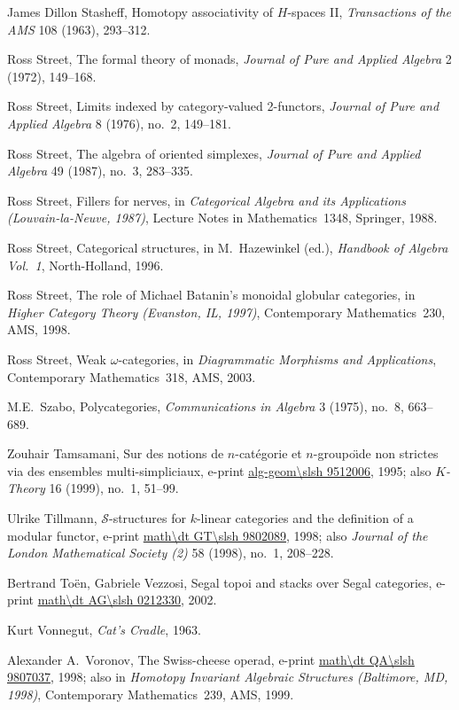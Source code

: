 \begin{thebibliography}{c9999}
James Dillon Stasheff,
Homotopy associativity of $H$-spaces II,
\emph{Transactions of the AMS} 108 (1963), 293--312.

Ross Street,
The formal theory of monads,
\emph{Journal of Pure and Applied Algebra} 2 (1972), 149--168.

Ross Street, 
Limits indexed by category-valued 2-functors,
\emph{Journal of Pure and Applied Algebra} 8 (1976), no.~2, 149--181.

Ross Street,
The algebra of oriented simplexes,
\emph{Journal of Pure and Applied Algebra} 49 (1987), no.~3, 283--335.

Ross Street,
Fillers for nerves,
in
\emph{Categorical Algebra and its Applications (Louvain-la-Neuve, 1987)},
Lecture Notes in Mathematics~1348,
Springer, 1988.

Ross Street,
Categorical structures, 
in
M.~Hazewinkel (ed.), 
\emph{Handbook of Algebra Vol.~1},
North-Holland, 1996.

Ross Street,
The role of Michael Batanin's monoidal globular categories,
in
\emph{Higher Category Theory (Evanston, IL, 1997)},
Contemporary Mathematics~230,
AMS, 1998.

Ross Street,
Weak $\omega$-categories,
in 
\emph{Diagrammatic Morphisms and Applications}, 
Contemporary Mathematics~318,
AMS, 2003.

M.E.~Szabo, 
Polycategories,
\emph{Communications in Algebra} 3 (1975), no.~8, 663--689.

Zouhair Tamsamani,
Sur des notions de $n$-cat\'egorie et $n$-groupo\"{\i}de non strictes via des
ensembles multi-simpliciaux,  
e-print \url{alg-geom\slsh 9512006}, 1995;
also
\emph{$K$-Theory} 16 (1999), no.~1, 51--99.

Ulrike Tillmann,
$\mathcal{S}$-structures for $k$-linear categories and the definition of a
modular functor,
e-print \url{math\dt GT\slsh 9802089}, 1998; 
also
\emph{Journal of the London Mathematical Society (2)} 58 (1998), no.~1,
208--228.

Bertrand To\"en, Gabriele Vezzosi, 
Segal topoi and stacks over Segal categories,
e-print \url{math\dt AG\slsh 0212330}, 2002.

Kurt Vonnegut, 
\emph{Cat's Cradle},
1963.

Alexander A.~Voronov, 
The Swiss-cheese operad,
e-print \url{math\dt QA\slsh 9807037}, 1998;
also in
\emph{Homotopy Invariant Algebraic Structures (Baltimore, MD, 1998)},
Contemporary Mathematics~239,
AMS, 1999.


\end{thebibliography}
